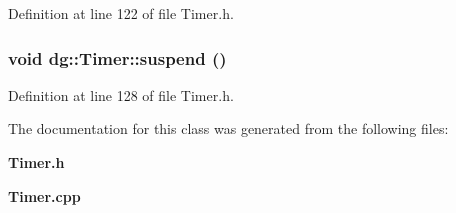 Definition at line 122 of file Timer.h.
\subsubsection{\setlength{\rightskip}{0pt plus 5cm}void dg::Timer::suspend ()\hspace{0.3cm}{\tt  [inline]}}\label{classdg_1_1Timer_a4}




Definition at line 128 of file Timer.h.

The documentation for this class was generated from the following files:\begin{CompactItemize}
\item 
{\bf Timer.h}\item 
{\bf Timer.cpp}\end{CompactItemize}
